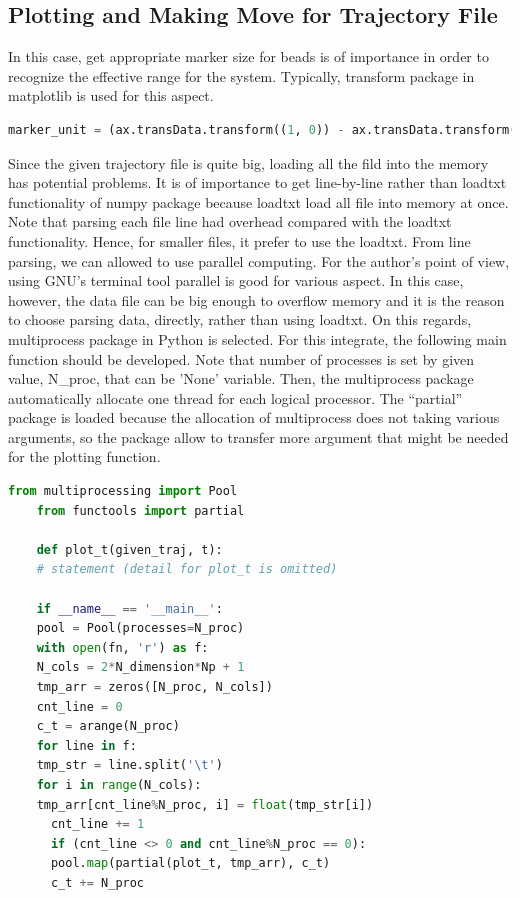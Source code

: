 \documentclass[10pt, a4paper]{report}
\begin{document}
\begin{appendices}
  \section{Plotting and Making Move for Trajectory File}
  In this case, get appropriate marker size for beads is of importance in order to recognize the effective range for the system. Typically, transform package in matplotlib is used for this aspect.
  \begin{lstlisting}[language=Python,frame=single,numbers=none]
    marker_unit = (ax.transData.transform((1, 0)) - ax.transData.transform((0, 0)))[0]
  \end{lstlisting}

  Since the given trajectory file is quite big, loading all the fild into the memory has potential problems. It is of importance to get line-by-line rather than loadtxt functionality of numpy package because loadtxt load all file into memory at once. Note that parsing each file line had overhead compared with the loadtxt functionality. Hence, for smaller files, it prefer to use the loadtxt. From line parsing, we can allowed to use parallel computing. For the author's point of view, using GNU's terminal tool parallel is good for various aspect. In this case, however, the data file can be big enough to overflow memory and it is the reason to choose parsing data, directly, rather than using loadtxt. On this regards, multiprocess package in Python is selected. For this integrate, the following main function should be developed. Note that number of processes is set by given value, N{\_}proc, that can be 'None' variable. Then, the multiprocess package automatically allocate one thread for each logical processor. The ``partial'' package is loaded because the allocation of multiprocess does not taking various arguments, so the package allow to transfer more argument that might be needed for the plotting function.

  \begin{lstlisting}[language=Python,frame=single]
    from multiprocessing import Pool
    from functools import partial

    def plot_t(given_traj, t):
    # statement (detail for plot_t is omitted)

    if __name__ == '__main__':
    pool = Pool(processes=N_proc)
    with open(fn, 'r') as f:
    N_cols = 2*N_dimension*Np + 1
    tmp_arr = zeros([N_proc, N_cols])
    cnt_line = 0
    c_t = arange(N_proc)
    for line in f:
    tmp_str = line.split('\t')
    for i in range(N_cols):
    tmp_arr[cnt_line%N_proc, i] = float(tmp_str[i])
      cnt_line += 1
      if (cnt_line <> 0 and cnt_line%N_proc == 0):
      pool.map(partial(plot_t, tmp_arr), c_t)
      c_t += N_proc
  \end{lstlisting}


\end{appendices}
\end{document}
